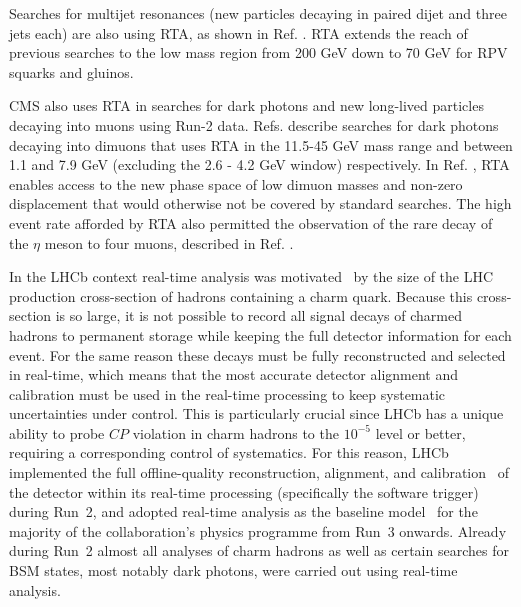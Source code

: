 
Searches for multijet resonances (new particles decaying in paired dijet and three jets each) are also using RTA, as shown in Ref. \cite{CMS:2018ikp}. RTA extends the reach of previous searches to the low mass region from 200 GeV down to 70 GeV for RPV squarks and gluinos. 

CMS also uses RTA in searches for dark photons and new long-lived particles decaying into muons using Run-2 data. Refs. \cite{CMS:2019buh, CMS:2023hwl} describe searches for dark photons decaying into dimuons that uses RTA in the 11.5-45 GeV mass range and between 1.1 and 7.9 GeV (excluding the 2.6 - 4.2 GeV window) respectively. In Ref. \cite{CMS:2021sch}, RTA enables access to the new phase space of low dimuon masses and non-zero displacement that would otherwise not be covered by standard searches.
The high event rate afforded by RTA also permitted the observation of the rare decay of the $\eta$ meson to four muons, described in Ref. \cite{CMS:2023thf}. 


In the LHCb context real-time analysis was motivated~\cite{Gligorov:2018fuk} by the size of the LHC production cross-section of hadrons containing a charm quark. Because this cross-section is so large, it is not possible to record all signal decays of charmed hadrons to permanent storage while keeping the full detector information for each event. For the same reason these decays must be fully reconstructed and selected in real-time, which means that the most accurate detector alignment and calibration must be used in the real-time processing to keep systematic uncertainties under control. This is particularly crucial since LHCb has a unique ability to probe $CP$ violation in charm hadrons to the $10^{-5}$ level or better, requiring a corresponding control of systematics. For this reason, LHCb implemented the full offline-quality reconstruction, alignment, and calibration~\cite{Dujany:2015lxd,Aaij:2016rxn,Borghi:2017hfp,LHCb:2018zdd,Aaij:2019uij} of the detector within its real-time processing (specifically the software trigger) during Run~2, and adopted real-time analysis as the baseline model~\cite{LHCbCollaboration:2319756} for the majority of the collaboration's physics programme from Run~3 onwards. Already during Run~2 almost all analyses of charm hadrons as well as certain searches for BSM states, most notably dark photons, were carried out using real-time analysis.